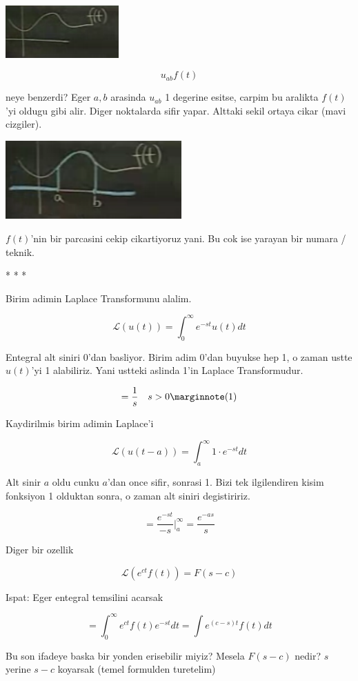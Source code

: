 \documentclass[12pt,fleqn]{article}\usepackage{../common}
\begin{document}
\includegraphics[height=2cm]{22_4.png}

\[ u_{ab}f(t) \]

neye benzerdi? Eger $a,b$ arasinda $u_{ab}$ 1 degerine esitse, carpim bu
aralikta $f(t)$'yi oldugu gibi alir. Diger noktalarda sifir yapar. Alttaki
sekil ortaya cikar (mavi cizgiler). 

\includegraphics[height=3cm]{22_5.png}

$f(t)$'nin bir parcasini cekip cikartiyoruz yani. Bu cok ise yarayan bir
numara / teknik. 

* * *

Birim adimin Laplace Transformunu alalim.

\[ \mathcal{L}(u(t)) = \int_{0}^{\infty} e^{-st}u(t) dt  \]

Entegral alt siniri 0'dan basliyor. Birim adim 0'dan buyukse hep 1, o zaman
ustte $u(t)$'yi 1 alabiliriz. Yani ustteki aslinda 1'in Laplace
Transformudur. 

\[ = \frac{1}{s} \ \ \ s>0 
\mlabel{1}
\]

Kaydirilmis birim adimin Laplace'i

\[ \mathcal{L} (u(t-a)) = 
\int_{a}^{\infty} 1 \cdot e^{-st} dt
 \]

Alt sinir $a$ oldu cunku $a$'dan once sifir, sonrasi 1. Bizi tek
ilgilendiren kisim fonksiyon 1 olduktan sonra, o zaman alt siniri 
degistiririz. 

\[ = \frac{e^{-st}}{-s} \bigg|_{a}^{\infty} =
\frac{e^{-as}}{s}
\]

Diger bir ozellik

\[ \mathcal{L}(e^{ct}f(t)) = F(s-c) \]

Ispat: Eger entegral temsilini acarsak

\[ = \int _{0}^{\infty} e^{ct}f(t)e^{-st}dt  =
\int e^{(c-s)t} f(t) dt
 \]


Bu son ifadeye baska bir yonden erisebilir miyiz? Mesela $F(s-c)$ nedir? 
$s$ yerine $s-c$ koyarsak (temel formulden turetelim)
\end{document}
